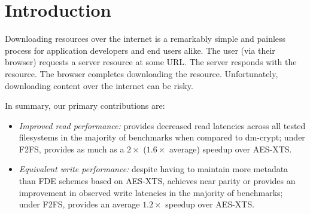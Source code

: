 \section{Introduction} \label{sec:introduction}

Downloading resources over the internet is a remarkably simple and painless
process for application developers and end users alike. The user (via their
browser) requests a server resource at some URL. The server responds with the
resource. The browser completes downloading the resource. Unfortunately,
downloading content over the internet can be risky.



In summary, our primary contributions are:

\begin{itemize}

  \item \emph{Improved read performance:} \SYSTEM{} provides decreased read
latencies across all tested filesystems in the majority of benchmarks when
compared to dm-crypt; \eg under F2FS, \SYSTEM{} provides as much as a $2\times$
($1.6\times$ average) speedup over AES-XTS.

  \item \emph{Equivalent write performance:} despite having to maintain more
metadata than FDE schemes based on AES-XTS, \SYSTEM{} achieves near parity or
provides an improvement in observed write latencies in the majority of
benchmarks; \eg under F2FS, \SYSTEM{} provides an average $1.2\times$ speedup
over AES-XTS.

\end{itemize}
